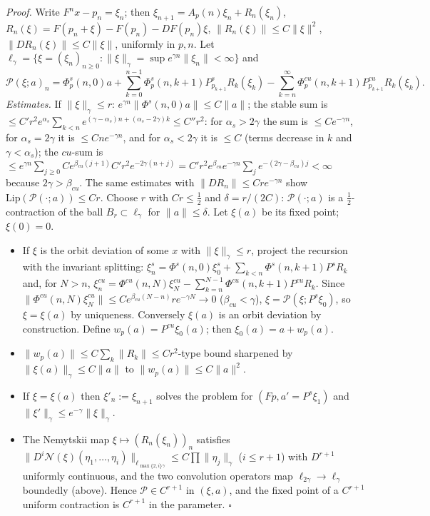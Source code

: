 \documentclass[11pt,a4paper]{article}
\theoremstyle{plain}
\theoremstyle{definition}
\theoremstyle{remark}
\numberwithin{equation}{section}
\numberwithin{figure}{section}
\begin{document}
\textit{Proof.} Write $F^nx-p_n=\xi_n$; then $\xi_{n+1}=A_p(n)\xi_n+R_n(\xi_n)$, $R_n(\xi)=F(p_n+\xi)-F(p_n)-DF(p_n)\xi$, $\|R_n(\xi)\|\le C\|\xi\|^2$, $\|DR_n(\xi)\|\le C\|\xi\|$, uniformly in $p,n$. Let $\ell_\gamma=\{\xi=(\xi_n)_{n\ge0}:\|\xi\|_\gamma=\sup e^{\gamma n}\|\xi_n\|<\infty\}$ and
\[
\mathcal P(\xi;a)_n=\Phi^s_p(n,0)a+\sum_{k=0}^{n-1}\Phi^s_p(n,k{+}1)P^s_{p_{k+1}}R_k(\xi_k)-\sum_{k=n}^\infty\Phi^{cu}_p(n,k{+}1)P^{cu}_{p_{k+1}}R_k(\xi_k).
\]
\textit{Estimates.} If $\|\xi\|_\gamma\le r$: $e^{\gamma n}\|\Phi^s(n,0)a\|\le C\|a\|$; the stable sum is $\le C'r^2e^{\alpha_s}\sum_{k<n}e^{(\gamma-\alpha_s)n+(\alpha_s-2\gamma)k}\le C''r^2$: for $\alpha_s>2\gamma$ the sum is $\le Ce^{-\gamma n}$, for $\alpha_s=2\gamma$ it is $\le Cne^{-\gamma n}$, and for $\alpha_s<2\gamma$ it is $\le C$ (terms decrease in $k$ and $\gamma<\alpha_s$); the $cu$-sum is $\le e^{\gamma n}\sum_{j\ge0}Ce^{\beta_{cu}(j+1)}C'r^2e^{-2\gamma(n+j)}=C'r^2e^{\beta_{cu}}e^{-\gamma n}\sum_je^{-(2\gamma-\beta_{cu})j}<\infty$ because $2\gamma>\beta_{cu}$. The same estimates with $\|DR_n\|\le Cr e^{-\gamma n}$ show $\mathrm{Lip}(\mathcal P(\cdot;a))\le C r$. Choose $r$ with $Cr\le\frac12$ and $\delta=r/(2C)$: $\mathcal P(\cdot;a)$ is a $\frac12$-contraction of the ball $B_r\subset\ell_\gamma$ for $\|a\|\le\delta$. Let $\xi(a)$ be its fixed point; $\xi(0)=0$.
\begin{itemize}
    \item[(a)] If $\xi$ is the orbit deviation of some $x$ with $\|\xi\|_\gamma\le r$, project the recursion with the invariant splitting: $\xi^s_n=\Phi^s(n,0)\xi^s_0+\sum_{k<n}\Phi^s(n,k+1)P^sR_k$ and, for $N>n$, $\xi^{cu}_n=\Phi^{cu}(n,N)\xi^{cu}_N-\sum_{k=n}^{N-1}\Phi^{cu}(n,k+1)P^{cu}R_k$. Since $\|\Phi^{cu}(n,N)\xi^{cu}_N\|\le Ce^{\beta_{cu}(N-n)}re^{-\gamma N}\to0$ ($\beta_{cu}<\gamma$), $\xi=\mathcal P(\xi;P^s\xi_0)$, so $\xi=\xi(a)$ by uniqueness. Conversely $\xi(a)$ is an orbit deviation by construction. Define $w_p(a)=P^{cu}\xi_0(a)$; then $\xi_0(a)=a+w_p(a)$.
    \item[(b)] $\|w_p(a)\|\le C\sum_k\|R_k\|\le Cr^2$-type bound sharpened by $\|\xi(a)\|_\gamma\le C\|a\|$ to $\|w_p(a)\|\le C\|a\|^2$.
    \item[(c)] If $\xi=\xi(a)$ then $\xi'_n:=\xi_{n+1}$ solves the problem for $(Fp,a'=P^s\xi_1)$ and $\|\xi'\|_\gamma\le e^{-\gamma}\|\xi\|_\gamma$.
    \item[(d)] The Nemytskii map $\xi\mapsto(R_n(\xi_n))_n$ satisfies $\|D^i\mathcal N(\xi)(\eta_1,\dots,\eta_i)\|_{\ell_{\max\{2,i\}\gamma}}\le C\prod\|\eta_j\|_\gamma$ ($i\le r+1$) with $D^{r+1}$ uniformly continuous, and the two convolution operators map $\ell_{2\gamma}\to\ell_\gamma$ boundedly (above). Hence $\mathcal P\in C^{r+1}$ in $(\xi,a)$, and the fixed point of a $C^{r+1}$ uniform contraction is $C^{r+1}$ in the parameter. $\square$
\end{itemize}
\end{document}
